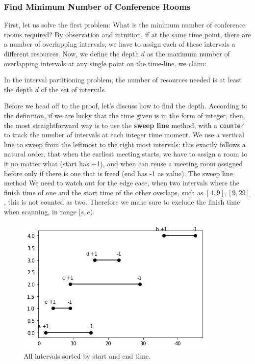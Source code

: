 \documentclass[../main.tex]{subfiles}
\begin{document}
\subsubsection{Find Minimum Number of Conference Rooms}
First, let us solve the first problem: What is the minimum number of conference rooms required? By observation and intuition, if at the same time point, there are a number of overlapping intervals, we have to assign each of these intervals a different resources. Now, we define the depth $d$ as the maximum number of overlapping intervals at any single point on the time-line, we claim: 
\begin{theorem}
In the interval partitioning problem, the number of resources needed is at least the depth $d$ of the set of intervals.
\end{theorem}
Before we head off to the proof, let's discuss how to find the depth. According to the definition, if we are lucky that the time given is in the form of integer, then, the most straightforward way is to use the \textbf{sweep line} method, with a \texttt{counter} to track the number of intervals at each integer time moment. We use a vertical line to sweep from the leftmost to the right most intervals: this exactly follows a natural order, that when the earliest meeting starts, we have to assign a room to it no matter what (start has +1), and when can  reuse a meeting room assigned before only if there is one that is freed (end has -1 as value). The sweep line method  We need to watch out for the edge case, when two intervals where the finish time of one and the start time of the other overlaps, such as $[4, 9], [9, 29]$, this is not counted as two. Therefore we make sure to exclude the finish time when scanning, in range $[s, e)$. 
\begin{figure}[H]
    \centering
    \includegraphics[width=0.7\columnwidth]{fig/greedy_schedule_all_intervals__sort_count.png}
    \caption{All intervals sorted by start and end time.}
    \label{fig:greedy_intervals_sort_count}
\end{figure}
\end{document}
